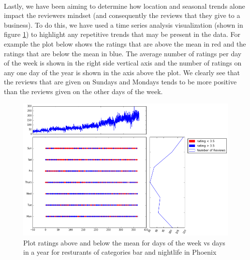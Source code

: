 \documentclass[11pt]{article}
\begin{document}
\paragraph{}
Lastly, we have been aiming to determine how location and seasonal trends alone impact the reviewers mindset (and consequently the reviews that they give to a business). To do this, we have used a time series analysis visualization (shown in figure \ref{fg:bars_nightlife}) to highlight any repetitive trends that may be present in the data. For example the plot below shows the ratings that are above the mean in red and the ratings that are below the mean in blue. The average number of ratings per day of the week is shown in the right side vertical axis and the number of ratings on any one day of the year is shown in the axis above the plot. We clearly see that the reviews that are given on Sundays and Mondays tends to be more positive than the reviews given on the other days of the week.
\begin{figure}[H]
\centering
\includegraphics[keepaspectratio=true,scale=0.4]{./images/bars_nightlife_popularity}
\caption{Plot ratings above and below the mean for days of the week vs days in a year for resturants of categories bar and nightlife in Phoenix}\label{fg:bars_nightlife}
\end{figure}
\end{document}
